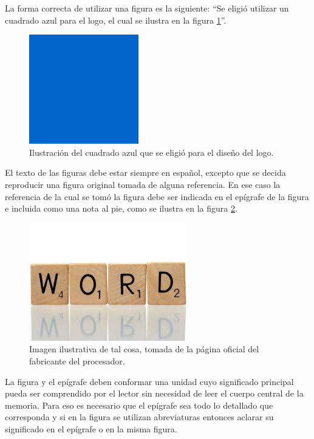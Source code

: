 La forma correcta de utilizar una figura es la siguiente: ``Se eligió utilizar un cuadrado azul para el logo, el cual se ilustra en la figura \ref{fig:cuadradoAzul}''.

\begin{figure}[h]
	\centering
	\includegraphics[scale=.4]{./Figures/cuadradoAzul.png}
	\caption{Ilustración del cuadrado azul que se eligió para el diseño del logo.}
	\label{fig:cuadradoAzul}
\end{figure}

El texto de las figuras debe estar siempre en español, excepto que se decida reproducir una figura original tomada de alguna referencia. En ese caso la referencia de la cual se tomó la figura debe ser indicada en el epígrafe de la figura e incluida como una nota al pie, como se ilustra en la figura \ref{fig:palabraIngles}.

\begin{figure}[hp]
	\centering
	\includegraphics[scale=.4]{./Figures/word.jpeg}
	\caption{Imagen  ilustrativa de tal cosa, tomada de la página oficial del fabricante del procesador\protect\footnotemark.}
	\label{fig:palabraIngles}
\end{figure}



La figura y el epígrafe deben conformar una unidad cuyo significado principal pueda ser comprendido por el lector sin necesidad de leer el cuerpo central de la memoria. Para eso es necesario que el epígrafe sea todo lo detallado que corresponda y si en la figura se utilizan abreviaturas entonces aclarar su significado en el epígrafe o en la misma figura.

